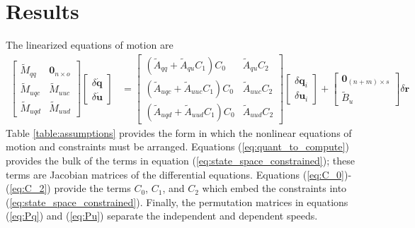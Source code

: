 \documentclass[smallcondensed]{svjour3}                     %
\begin{document}
\section{Results}
\label{sec:results}
The linearized equations of motion are
\begin{align}
  \label{eq:state_space_constrained}
  \left[
    \begin{array}{cc}
      \tilde{M}_{qq} & \bm{0}_{n \times o} \\
      \tilde{M}_{uqc} & \tilde{M}_{uuc} \\
      \tilde{M}_{uqd} & \tilde{M}_{uud}
    \end{array}
    \right]
    \left[
      \begin{array}{c}
        \delta \bm{\dot{q}} \\
        \delta \bm{\dot{u}}
      \end{array}
    \right]
   &=
   \left[
     \begin{array}{cc}
       (\tilde{A}_{qq} + \tilde{A}_{qu} C_1 ) C_0 & \tilde{A}_{qu} C_2 \\
       (\tilde{A}_{uqc} + \tilde{A}_{uuc} C_1 ) C_0 & \tilde{A}_{uuc} C_2\\
       (\tilde{A}_{uqd} + \tilde{A}_{uud} C_1 ) C_0 & \tilde{A}_{uud} C_2
     \end{array}
   \right]
    \left[
      \begin{array}{c}
        \delta \bm{q}_i \\
        \delta \bm{u}_i
      \end{array}
    \right]
    +
    \left[
      \begin{array}{c}
        \bm{0}_{(n+m) \times s} \\
        \tilde{B}_{u}
      \end{array}
    \right]
    \delta \bm{r}
\end{align}
Table \ref{table:assumptions} provides the form in which the nonlinear
equations of motion and constraints must be arranged.  Equations
(\ref{eq:quant_to_compute}) provides the bulk of the terms in equation
(\ref{eq:state_space_constrained}); these terms are Jacobian matrices of the
differential equations. Equations (\ref{eq:C_0})-(\ref{eq:C_2}) provide the
terms $C_0$, $C_1$, and $C_2$ which embed the constraints into
(\ref{eq:state_space_constrained}). Finally, the permutation matrices in
equations (\ref{eq:Pq}) and (\ref{eq:Pu}) separate the independent and
dependent speeds.
\end{document}
